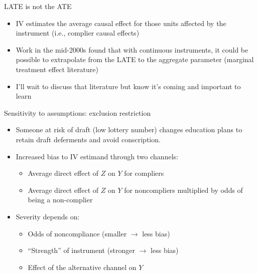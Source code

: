 \documentclass{beamer}
\begin{document}
\begin{frame}{LATE is not the ATE}
	
	\begin{itemize}
	\item IV estimates the average causal effect for those units affected by the instrument (i.e., complier causal effects)
	\item Work in the mid-2000s found that with continuous instruments, it could be possible to extrapolate from the LATE to the aggregate parameter (marginal treatment effect literature)
	\item I'll wait to discuss that literature but know it's coming and important to learn
	\end{itemize}

\end{frame}

		
\begin{frame}{Sensitivity to assumptions: exclusion restriction}
	
\begin{itemize}
	
\item Someone at risk of draft (low lottery number) changes education plans to retain draft deferments and avoid conscription. 

\item Increased bias to IV estimand through two channels:
		\begin{itemize}
		\item Average direct effect of $Z$ on $Y$ for compliers
		\item Average direct effect of $Z$ on $Y$ for noncompliers multiplied by odds of being a non-complier
		\end{itemize}

\item Severity depends on: 
		\begin{itemize}
		\item Odds of noncompliance (smaller $\rightarrow$ less bias)
		\item ``Strength'' of instrument (stronger $\rightarrow$ less bias)
		\item Effect of the alternative channel on $Y$
		\end{itemize}
\end{itemize}

\end{frame}
\end{document}
